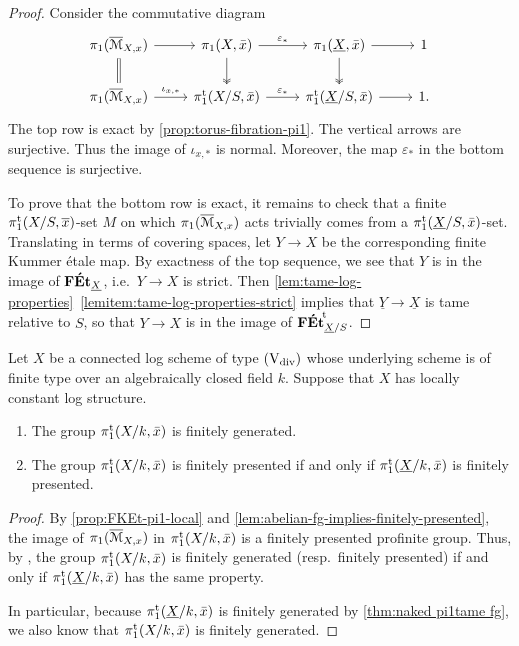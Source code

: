 \begin{proof}
Consider the commutative diagram
\[
    \begin{tikzcd}
        \pi_1(\ov \cM_{X,x}) \ar[d,equal] \ar[r] & \pi_1(X,\bar x) \ar[r,"\ep_\ast"]\ar[d,two heads]  & \pi_1(\underline{X},\bar x) \ar[r]\ar[d,two heads] & 1 \\
        \pi_1(\ov \cM_{X,x}) \ar[r,"\iota_{x,\ast}"] & \pitame(X/S,\bar x) \ar[r,"\ep_\ast"] & \pitame(\underline{X}/S,\bar x) \ar[r] & 1.
    \end{tikzcd}
\]
The top row is exact by \cref{prop:torus-fibration-pi1}. The vertical arrows are surjective. Thus the image of $\iota_{x,\ast}$ is normal. Moreover, the map $\varepsilon_*$ in the bottom sequence is surjective. 

To prove that the bottom row is exact, it remains to check that a finite $\pi_1^{\mathrm{t}}(X/S,\overline{x})$-set $M$ on which $\pi_1(\overline{{\mathcal M}}_{X,x})$ acts trivially comes from a $\pi_1^{\mathrm{t}}(\underline{X}/S,\bar x)$-set. Translating in terms of covering spaces, let $Y\to X$ be the corresponding finite Kummer \'etale map. By exactness of the top sequence, we see that $Y$ is in the image of $\mathbf{F\acute{E}t}_{\underline{X}}$, i.e.\ $Y\to X$ is strict. Then \cref{lem:tame-log-properties}~\ref{lemitem:tame-log-properties-strict} implies that $\underline{Y}\to\underline{X}$ is tame relative to $S$, so that $Y\to X$ is in the image of ${\mathbf{F\acute{E}t}}^{\!\mathrm{t}}_{\underline{X}/S}$.
\end{proof}

\begin{cor}
\label{cor:pi1tame locally constant log is fg}
    Let $X$ be a connected log scheme of type $(\mathrm{V}_{\rm div})$ whose underlying scheme is of finite type over an algebraically closed field $k$. Suppose that $X$ has locally constant log structure.
    \begin{enumerate}
        \item 
        The group $\pi_1^{\mathrm{t}}(X/k,\bar x)$ is finitely generated.
        \item 
        The group $\pi_1^{\mathrm{t}}(X/k,\bar x)$ is finitely presented if and only if $\pi_1^{\mathrm{t}}(\underline{X}/k,\bar x)$ is finitely presented.
    \end{enumerate}
\end{cor}

\begin{proof}
    By \cref{prop:FKEt-pi1-local} and 
    \cref{lem:abelian-fg-implies-finitely-presented},
    the image of 
    $\pi_1(\overline{{\mathcal M}}_{X,x})$ in $\pi_1^{\mathrm{t}}(X/k,\bar x)$ is a finitely presented profinite group.  
    Thus, by 
    \cite[Proof of Claim~2.7]{EsnaultShustermanSrinivas2022:FinitePresentationTame}, the group 
    $\pi_1^{\mathrm{t}}(X/k,\bar x)$ is finitely generated (resp.\ finitely presented) if and only if $\pi_1^{\mathrm{t}}(\underline{X}/k,\bar x)$ has the same property. 

    In particular, because $\pi_1^{\mathrm{t}}(\underline{X}/k,\bar x)$ is finitely generated by \cref{thm:naked pi1tame fg}, we also know that $\pi_1^{\mathrm{t}}(X/k,\bar x)$ is finitely generated.    
\end{proof}

